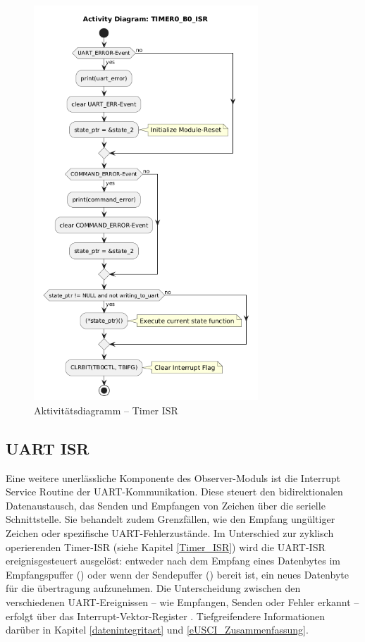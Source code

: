 \begin{figure}[h!]
	\centering
	\includegraphics[width=0.75\textwidth]{../Bilder/observer_activity_diagram_timer_b0.png}
	\caption{Aktivit\"atsdiagramm -- Timer ISR}
	\label{fig:activity_diagram_timer_isr}
\end{figure}

\newpage
\subsection{UART ISR}
\label{UART_ISR}

Eine weitere unerl\"assliche Komponente des Observer-Moduls ist die Interrupt Service Routine der UART-Kommunikation. Diese steuert den bidirektionalen Datenaustausch, \dh das Senden und Empfangen von Zeichen \"uber die serielle Schnittstelle. Sie behandelt zudem Grenzf\"allen, wie den Empfang ung\"ultiger Zeichen oder spezifische UART-Fehlerzust\"ande. Im Unterschied zur zyklisch operierenden Timer-ISR (siehe Kapitel \ref{Timer_ISR}) wird die UART-ISR ereignisgesteuert ausgel\"ost: entweder nach dem Empfang eines Datenbytes im Empfangspuffer () oder wenn der Sendepuffer () bereit ist, ein neues Datenbyte f\"ur die \"ubertragung aufzunehmen. Die Unterscheidung zwischen den verschiedenen UART-Ereignissen -- wie \zB Empfangen, Senden oder Fehler erkannt -- erfolgt \"uber das Interrupt-Vektor-Register . Tiefgreifendere Informationen dar\"uber in Kapitel \ref{datenintegritaet} und \ref{eUSCI_Zusammenfassung}.

